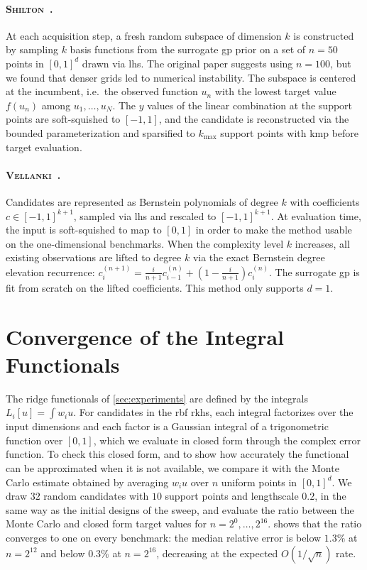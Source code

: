 \documentclass{article}
\newcommand{\vellanky}{\textsc{Vellanki}~\cite{vellanki2019bayesian}}
\newcommand{\shilton}{\textsc{Shilton}~\cite{shilton2020sequential}}
\newcommand{\vu}{u}
\begin{document}
\paragraph{\shilton.}
At each acquisition step, a fresh random subspace of dimension $k$ is constructed by sampling $k$ basis functions from the surrogate \gls{gp} prior on a set of $n=50$ points in $[0,1]^d$ drawn via \gls{lhs}. The original paper suggests using $n=100$, but we found that denser grids led to numerical instability.
The subspace is centered at the incumbent, i.e.\ the observed function $\vu_n$ with the lowest target value $f(\vu_n)$ among $\vu_1, \ldots, \vu_N$.
The $y$ values of the linear combination at the support points are soft-squished to $[-1,1]$, and the candidate is reconstructed via the bounded parameterization and sparsified to $k_{\max}$ support points with \gls{kmp} before target evaluation.

\paragraph{\vellanky.}
Candidates are represented as Bernstein polynomials of degree $k$ with coefficients $c \in [-1,1]^{k+1}$, sampled via \gls{lhs} and rescaled to $[-1,1]^{k+1}$.
At evaluation time, the input is soft-squished to map to $[0,1]$ in order to make the method usable on the one-dimensional benchmarks.
When the complexity level $k$ increases, all existing observations are lifted to degree $k$ via the exact Bernstein degree elevation recurrence:
$c^{(n+1)}_i = \frac{i}{n+1} c^{(n)}_{i-1} + \left(1 - \frac{i}{n+1}\right) c^{(n)}_i$.
The surrogate \gls{gp} is fit from scratch on the lifted coefficients.
This method only supports $d=1$.

\FloatBarrier
\section{Convergence of the Integral Functionals}
\label{app:convergence}

The ridge functionals of \cref{sec:experiments} are defined by the integrals $L_i[\vu] = \int w_i \vu$.
For candidates in the \gls{rbf} \gls{rkhs}, each integral factorizes over the input dimensions and each factor is a Gaussian integral of a trigonometric function over $[0,1]$, which we evaluate in closed form through the complex error function.
To check this closed form, and to show how accurately the functional can be approximated when it is not available, we compare it with the Monte Carlo estimate obtained by averaging $w_i \vu$ over $n$ uniform points in $[0,1]^d$.
We draw $32$ random candidates with $10$ support points and lengthscale $0.2$, in the same way as the initial designs of the sweep, and evaluate the ratio between the Monte Carlo and closed form target values for $n = 2^0, \ldots, 2^{16}$.
 shows that the ratio converges to one on every benchmark: the median relative error is below $1.3\%$ at $n=2^{12}$ and below $0.3\%$ at $n=2^{16}$, decreasing at the expected $O(1/\sqrt{n})$ rate.
\end{document}

